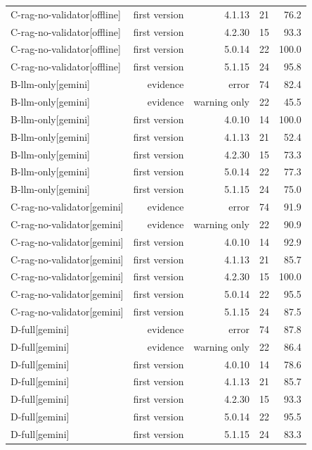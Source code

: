 \begin{table}[t]
\begin{tabular}{lrrrr}
C-rag-no-validator[offline] & first version & 4.1.13 & 21 & 76.2 \\
C-rag-no-validator[offline] & first version & 4.2.30 & 15 & 93.3 \\
C-rag-no-validator[offline] & first version & 5.0.14 & 22 & 100.0 \\
C-rag-no-validator[offline] & first version & 5.1.15 & 24 & 95.8 \\
B-llm-only[gemini] & evidence & error & 74 & 82.4 \\
B-llm-only[gemini] & evidence & warning only & 22 & 45.5 \\
B-llm-only[gemini] & first version & 4.0.10 & 14 & 100.0 \\
B-llm-only[gemini] & first version & 4.1.13 & 21 & 52.4 \\
B-llm-only[gemini] & first version & 4.2.30 & 15 & 73.3 \\
B-llm-only[gemini] & first version & 5.0.14 & 22 & 77.3 \\
B-llm-only[gemini] & first version & 5.1.15 & 24 & 75.0 \\
C-rag-no-validator[gemini] & evidence & error & 74 & 91.9 \\
C-rag-no-validator[gemini] & evidence & warning only & 22 & 90.9 \\
C-rag-no-validator[gemini] & first version & 4.0.10 & 14 & 92.9 \\
C-rag-no-validator[gemini] & first version & 4.1.13 & 21 & 85.7 \\
C-rag-no-validator[gemini] & first version & 4.2.30 & 15 & 100.0 \\
C-rag-no-validator[gemini] & first version & 5.0.14 & 22 & 95.5 \\
C-rag-no-validator[gemini] & first version & 5.1.15 & 24 & 87.5 \\
D-full[gemini] & evidence & error & 74 & 87.8 \\
D-full[gemini] & evidence & warning only & 22 & 86.4 \\
D-full[gemini] & first version & 4.0.10 & 14 & 78.6 \\
D-full[gemini] & first version & 4.1.13 & 21 & 85.7 \\
D-full[gemini] & first version & 4.2.30 & 15 & 93.3 \\
D-full[gemini] & first version & 5.0.14 & 22 & 95.5 \\
D-full[gemini] & first version & 5.1.15 & 24 & 83.3 \\
\bottomrule
\end{tabular}
\end{table}
